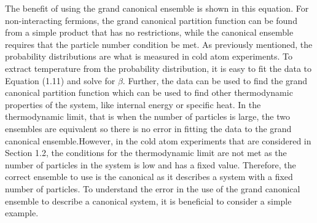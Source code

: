 The benefit of using the grand canonical ensemble is shown in this equation. For non-interacting fermions, the grand canonical partition function can be found from a simple product that has no restrictions, while the canonical ensemble requires that the particle number condition be met. As previously mentioned, the probability distributions are what is measured in cold atom experiments. To extract temperature from the probability distribution, it is easy to fit the data to Equation (1.11) and solve for $\beta$. Further, the data can be used to find the grand canonical partition function which can be used to find other thermodynamic properties of the system, like internal energy or specific heat. In the thermodynamic limit, that is when the number of particles is large, the two ensembles are equivalent so there is no error in fitting the data to the grand canonical ensemble.However, in the cold atom experiments that are considered in Section 1.2, the conditions for the thermodynamic limit are not met as the number of particles in the system is low and has a fixed value. Therefore, the correct ensemble to use is the canonical as it describes a system with a fixed number of particles. To understand the error in the use of the grand canonical ensemble to describe a canonical system, it is beneficial to consider a simple example. 



